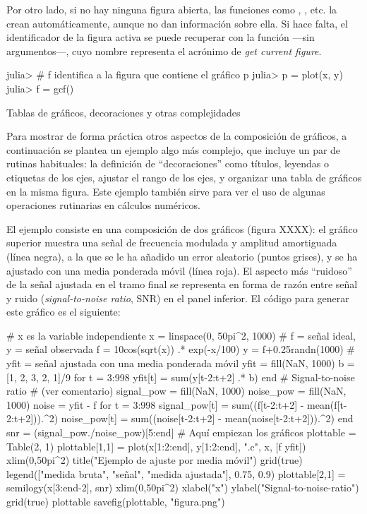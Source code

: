 ﻿\documentclass[spanish]{article}
\begin{document}
Por otro lado, si no hay ninguna figura abierta, las funciones como , , etc. la crean automáticamente, aunque no dan información sobre ella. Si hace falta, el identificador de la figura activa se puede recuperar con la función  ---sin argumentos---, cuyo nombre representa el acrónimo de \emph{get current figure}.

julia> # f identifica a la figura que contiene el gráfico p
julia> p = plot(x, y)
julia> f = gcf()


Tablas de gráficos, decoraciones y otras complejidades

Para mostrar de forma práctica otros aspectos de la composición de gráficos, a continuación se plantea un ejemplo algo más complejo, que incluye un par de rutinas habituales: la definición de ``decoraciones'' como títulos, leyendas o etiquetas de los ejes, ajustar el rango de los ejes, y organizar una tabla de gráficos en la misma figura. Este ejemplo también sirve para ver el uso de algunas operaciones rutinarias en cálculos numéricos.

El ejemplo consiste en una composición de dos gráficos (figura XXXX): el gráfico superior muestra una señal de frecuencia modulada y amplitud amortiguada (línea negra), a la que se le ha añadido un error aleatorio (puntos grises), y se ha ajustado con una media ponderada móvil (línea roja). El aspecto más ``ruidoso'' de la señal ajustada en el tramo final se representa en forma de razón entre señal y ruido (\emph{signal-to-noise ratio}, SNR) en el panel inferior. El código para generar este gráfico es el siguiente:

# x es la variable independiente
x = linspace(0, 50pi^2, 1000)
# f = señal ideal, y = señal observada
f = 10cos(sqrt(x)) .* exp(-x/100)
y = f+0.25randn(1000)
# yfit = señal ajustada con una media ponderada móvil
yfit = fill(NaN, 1000)
b = [1, 2, 3, 2, 1]/9
for t = 3:998
  yfit[t] = sum(y[t-2:t+2] .* b)
end
# Signal-to-noise ratio
# (ver comentario)
signal_pow = fill(NaN, 1000)
noise_pow = fill(NaN, 1000)
noise = yfit - f
for t = 3:998
  signal_pow[t] = sum((f[t-2:t+2] - mean(f[t-2:t+2])).^2)
  noise_pow[t] = sum((noise[t-2:t+2] - mean(noise[t-2:t+2])).^2)
end
snr = (signal_pow./noise_pow)[5:end]
# Aquí empiezan los gráficos
plottable = Table(2, 1)
plottable[1,1] = plot(x[1:2:end], y[1:2:end], ".c", x, [f yfit])
xlim(0,50pi^2)
title("Ejemplo de ajuste por media móvil")
grid(true)
legend(["medida bruta", "señal", "medida ajustada"], 0.75, 0.9)
plottable[2,1] = semilogy(x[3:end-2], snr)
xlim(0,50pi^2)
xlabel("x")
ylabel("Signal-to-noise-ratio")
grid(true)
plottable
savefig(plottable, "figura.png")
\end{document}
